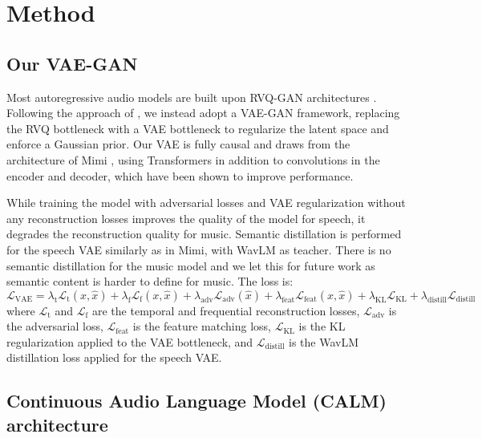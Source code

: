 
\section{Method}
\label{sec:method}

\subsection{Our VAE-GAN}
Most autoregressive audio models are built upon RVQ-GAN architectures \citep{soundstream, encodec, dac, speech_codec_comparaison}. Following the approach of \citet{stable_audio}, we instead adopt a VAE-GAN framework, replacing the RVQ bottleneck with a VAE bottleneck to regularize the latent space and enforce a Gaussian prior. Our VAE is fully causal and draws from the architecture of Mimi \citep{moshi}, using Transformers in addition to convolutions in the encoder and decoder, which have been shown to improve performance. 

While training the model with adversarial losses and VAE regularization without any reconstruction losses improves the quality of the model for speech, it degrades the reconstruction quality for music. Semantic distillation is performed for the speech VAE similarly as in Mimi, with WavLM \citep{wavlm} as teacher. There is no semantic distillation for the music model and we let this for future work as semantic content is harder to define for music. The loss is: 
\begin{equation}
    \mathcal{L}_{\text{VAE}} = \lambda_{\text{t}} \mathcal{L}_{\text{t}}(x, \hat{x}) + \lambda_{\text{f}} \mathcal{L}_{\text{f}}(x, \hat{x}) + \lambda_{\text{adv}} \mathcal{L}_{\text{adv}}(\hat{x}) + \lambda_{\text{feat}} \mathcal{L}_{\text{feat}}(x, \hat{x}) + \lambda_{\text{KL}} \mathcal{L}_{\text{KL}} +
    \lambda_{\text{distill}} \mathcal{L}_{\text{distill}}
\end{equation}
where $\mathcal{L}_{\text{t}}$ and $\mathcal{L}_{\text{f}}$ are the temporal and frequential reconstruction losses, $\mathcal{L}_{\text{adv}}$ is the adversarial loss, $\mathcal{L}_{\text{feat}}$ is the feature matching loss, $\mathcal{L}_{\text{KL}}$ is the KL regularization applied to the VAE bottleneck, and $\mathcal{L}_{\text{distill}}$ is the WavLM distillation loss applied for the speech VAE.

\subsection{Continuous Audio Language Model (CALM) architecture}

